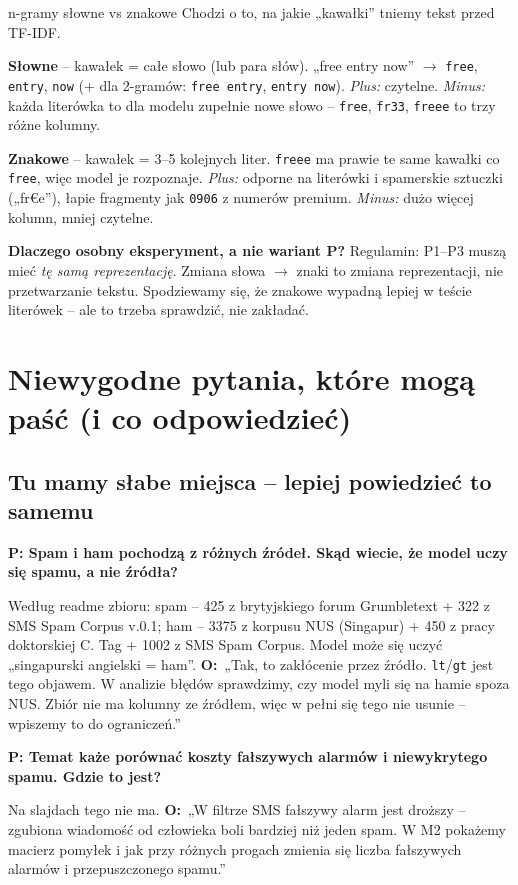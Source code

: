 \documentclass[11pt,a4paper]{article}
\newcommand{\pyt}[1]{\par\medskip\textbf{\color{spam}P: #1}\par}
\newcommand{\odp}{\textbf{O:}~}
\begin{document}
\begin{pojecie}{n-gramy słowne vs znakowe}
Chodzi o to, na jakie „kawałki” tniemy tekst przed TF-IDF.

\textbf{Słowne} -- kawałek = całe słowo (lub para słów). „free entry now” $\to$ \texttt{free}, \texttt{entry}, \texttt{now}
(+ dla 2-gramów: \texttt{free entry}, \texttt{entry now}). \textit{Plus:} czytelne. \textit{Minus:} każda literówka to dla
modelu zupełnie nowe słowo -- \texttt{free}, \texttt{fr33}, \texttt{freee} to trzy różne kolumny.

\textbf{Znakowe} -- kawałek = 3--5 kolejnych liter. \texttt{freee} ma prawie te same kawałki co \texttt{free}, więc model je
rozpoznaje. \textit{Plus:} odporne na literówki i spamerskie sztuczki („fr€e”), łapie fragmenty jak \texttt{0906} z numerów
premium. \textit{Minus:} dużo więcej kolumn, mniej czytelne.

\textbf{Dlaczego osobny eksperyment, a nie wariant P?} Regulamin: P1--P3 muszą mieć \emph{tę samą reprezentację}. Zmiana
słowa $\to$ znaki to zmiana reprezentacji, nie przetwarzanie tekstu. Spodziewamy się, że znakowe wypadną lepiej w teście
literówek -- ale to trzeba sprawdzić, nie zakładać.
\end{pojecie}

\section{Niewygodne pytania, które mogą paść (i co odpowiedzieć)}

\subsection{Tu mamy słabe miejsca -- lepiej powiedzieć to samemu}

\pyt{Spam i ham pochodzą z różnych źródeł. Skąd wiecie, że model uczy się spamu, a nie źródła?}
Według readme zbioru: spam -- 425 z brytyjskiego forum Grumbletext + 322 z SMS Spam Corpus v.0.1; ham -- 3375 z korpusu NUS
(Singapur) + 450 z pracy doktorskiej C. Tag + 1002 z SMS Spam Corpus. Model może się uczyć „singapurski angielski = ham”.
\odp „Tak, to zakłócenie przez źródło. \texttt{lt}/\texttt{gt} jest tego objawem. W analizie błędów sprawdzimy, czy model myli
się na hamie spoza NUS. Zbiór nie ma kolumny ze źródłem, więc w pełni się tego nie usunie -- wpiszemy to do ograniczeń.”

\pyt{Temat każe porównać koszty fałszywych alarmów i niewykrytego spamu. Gdzie to jest?}
Na slajdach tego nie ma.
\odp „W filtrze SMS fałszywy alarm jest droższy -- zgubiona wiadomość od człowieka boli bardziej niż jeden spam. W M2
pokażemy macierz pomyłek i jak przy różnych progach zmienia się liczba fałszywych alarmów i przepuszczonego spamu.”
\end{document}

